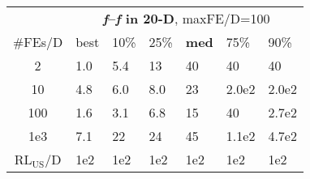 \begin{tabular}{c|llllll}
 & \multicolumn{6}{|c}{\textbf{\textit{f}\raisebox{-0.35ex}{1}--\textit{f}\raisebox{-0.35ex}{24} in 20-D}, maxFE/D=100}\\
\#FEs/D & best & 10\% & 25\% & \textbf{med} & 75\% & 90\%\\
2 & \hspace*{1ex}1.0 & \hspace*{1ex}5.4 & 13 & 40 & 40 & 40\\
10 & \hspace*{1ex}4.8 & \hspace*{1ex}6.0 & \hspace*{1ex}8.0 & 23 & 2.0e2 & 2.0e2\\
100 & \hspace*{1ex}1.6 & \hspace*{1ex}3.1 & \hspace*{1ex}6.8 & 15 & 40 & 2.7e2\\
1e3 & \hspace*{1ex}7.1 & 22 & 24 & 45 & 1.1e2 & 4.7e2\\
$\text{RL}_{\text{US}}$/D & 1e2 & 1e2 & 1e2 & 1e2 & 1e2 & 1e2
\end{tabular}
